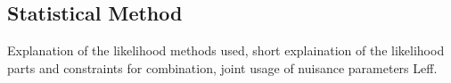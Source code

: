 \subsection{Statistical Method}
Explanation of the likelihood methods used, short explaination of the likelihood parts and constraints for combination, joint usage of nuisance parameters {Leff}.

